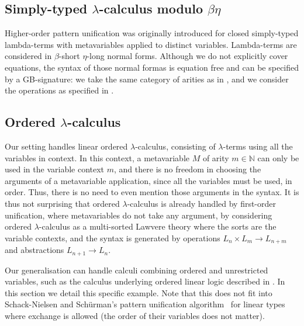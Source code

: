 \subsection{Simply-typed $\lambda$-calculus modulo $\beta$$\eta$}

\label{subsec:normalised-lc}

Higher-order pattern unification was originally introduced for closed
simply-typed lambda-terms with metavariables applied to distinct variables.
Lambda-terms are considered in $\beta$-short $\eta$-long normal
forms. Although we do not explicitly cover equations, the syntax of
those normal formas is equation free and can be specified by a GB-signature:
we take the same category of arities as in ,
and we consider the operations as specified in .

\subsection{Ordered $\lambda$-calculus}

\label{subsec:ordered-calculus}

Our setting handles linear ordered $\lambda$-calculus, consisting
of $\lambda$-terms using all the variables in context. In this context,
a metavariable $M$ of arity $m\in\mathbb{N}$ can only be used in
the variable context $m$, and there is no freedom in choosing the
arguments of a metavariable application, since all the variables must
be used, in order. Thus, there is no need to even mention those arguments
in the syntax. It is thus not surprising that ordered $\lambda$-calculus
is already handled by first-order unification, where metavariables
do not take any argument, by considering ordered $\lambda$-calculus
as a multi-sorted Lawvere theory where the sorts are the variable
contexts, and the syntax is generated by operations $L_{n}\times L_{m}\rightarrow L_{n+m}$
and abstractions $L_{n+1}\rightarrow L_{n}$. 

Our generalisation can handle calculi combining ordered and unrestricted
variables, such as the calculus underlying ordered linear logic described
in \citet{Polakow00lfm}. In this section we detail this specific
example. Note that this does not fit into Schack-Nielsen and Schürman's
pattern unification algorithm~\citet{DBLP:journals/corr/abs-1009-2795}
for linear types where exchange is allowed (the order of their variables
does not matter).

